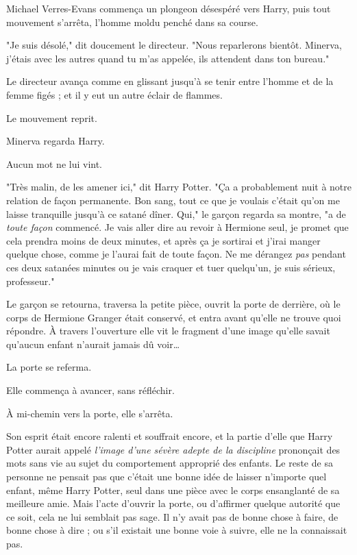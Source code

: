 Michael Verres-Evans commença un plongeon désespéré vers Harry, puis tout mouvement s'arrêta, l'homme moldu penché dans sa course.

"Je suis désolé," dit doucement le directeur. "Nous reparlerons bientôt. Minerva, j'étais avec les autres quand tu m'as appelée, ils attendent dans ton bureau."

Le directeur avança comme en glissant jusqu'à se tenir entre l'homme et de la femme figés ; et il y eut un autre éclair de flammes.

Le mouvement reprit.

Minerva regarda Harry.

Aucun mot ne lui vint.

"Très malin, de les amener ici," dit Harry Potter. "Ça a probablement nuit à notre relation de façon permanente. Bon sang, tout ce que je voulais c'était qu'on me laisse tranquille jusqu'à ce satané dîner. Qui," le garçon regarda sa montre, "a de \emph{toute façon}  commencé. Je vais aller dire au revoir à Hermione seul, je promet que cela prendra moins de deux minutes, et après ça je sortirai et j'irai manger quelque chose, comme je l'aurai fait de toute façon. Ne me dérangez \emph{pas}  pendant ces deux satanées minutes ou je vais craquer et tuer quelqu'un, je suis sérieux, professeur."

Le garçon se retourna, traversa la petite pièce, ouvrit la porte de derrière, où le corps de Hermione Granger était conservé, et entra avant qu'elle ne trouve quoi répondre. À travers l'ouverture elle vit le fragment d'une image qu'elle savait qu'aucun enfant n'aurait jamais dû voir…

La porte se referma.

Elle commença à avancer, sans réfléchir.

À mi-chemin vers la porte, elle s'arrêta.

Son esprit était encore ralenti et souffrait encore, et la partie d'elle que Harry Potter aurait appelé \emph{l'image d'une sévère adepte de la discipline}  prononçait des mots sans vie au sujet du comportement approprié des enfants. Le reste de sa personne ne pensait pas que c'était une bonne idée de laisser n'importe quel enfant, même Harry Potter, seul dans une pièce avec le corps ensanglanté de sa meilleure amie. Mais l'acte d'ouvrir la porte, ou d'affirmer quelque autorité que ce soit, cela ne lui semblait pas sage. Il n'y avait pas de bonne chose à faire, de bonne chose à dire ; ou s'il existait une bonne voie à suivre, elle ne la connaissait pas.

